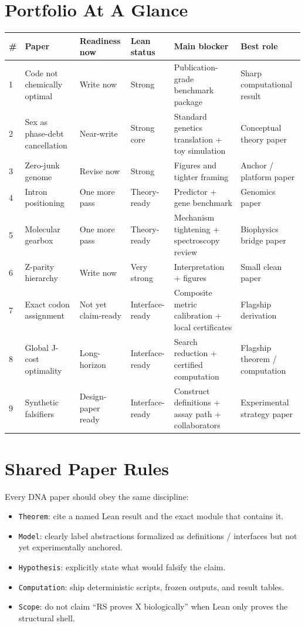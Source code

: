 \documentclass[11pt]{article}
\begin{document}
\section*{Portfolio At A Glance}
\footnotesize
\begin{longtable}{@{}p{}p{}p{}p{}p{}p{}@{}}
\toprule
\# & Paper & Readiness now & Lean status & Main blocker & Best role \\
\midrule
1 & Code not chemically optimal & Write now & Strong & Publication-grade benchmark package & Sharp computational result \\
2 & Sex as phase-debt cancellation & Near-write & Strong core & Standard genetics translation + toy simulation & Conceptual theory paper \\
3 & Zero-junk genome & Revise now & Strong & Figures and tighter framing & Anchor / platform paper \\
4 & Intron positioning & One more pass & Theory-ready & Predictor + gene benchmark & Genomics paper \\
5 & Molecular gearbox & One more pass & Theory-ready & Mechanism tightening + spectroscopy review & Biophysics bridge paper \\
6 & Z-parity hierarchy & Write now & Very strong & Interpretation + figures & Small clean paper \\
7 & Exact codon assignment & Not yet claim-ready & Interface-ready & Composite metric calibration + local certificates & Flagship derivation \\
8 & Global J-cost optimality & Long-horizon & Interface-ready & Search reduction + certified computation & Flagship theorem / computation \\
9 & Synthetic falsifiers & Design-paper ready & Interface-ready & Construct definitions + assay path + collaborators & Experimental strategy paper \\
\bottomrule
\end{longtable}
\normalsize

\section*{Shared Paper Rules}
Every DNA paper should obey the same discipline:
\begin{itemize}
\item \texttt{Theorem}: cite a named Lean result and the exact module that contains it.
\item \texttt{Model}: clearly label abstractions formalized as definitions / interfaces but not yet experimentally anchored.
\item \texttt{Hypothesis}: explicitly state what would falsify the claim.
\item \texttt{Computation}: ship deterministic scripts, frozen outputs, and result tables.
\item \texttt{Scope}: do not claim ``RS proves X biologically'' when Lean only proves the structural shell.
\end{itemize}
\end{document}
